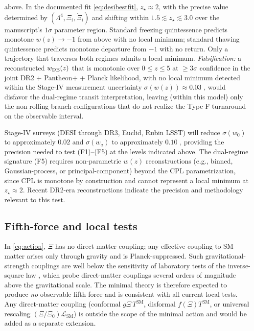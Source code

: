 \documentclass[11pt,reqno]{amsart}
\theoremstyle{plain}
\theoremstyle{definition}
\theoremstyle{remark}
\newcommand{\SM}{\mathrm{SM}}
\begin{document}
\begin{enumerate}
        above. In the documented fit \eqref{eq:desibestfit},
        $z_\star \approx 2$, with the precise value determined by
        $(\Lambda^{4}, \Xi_i, \dot\Xi_i)$ and shifting within
        $1.5 \lesssim z_\star \lesssim 3.0$ over the manuscript's
        $1\sigma$ parameter region. Standard freezing quintessence
        \cite{CaldwellLinder2005} predicts monotone $w(z) \to -1$ from
        above with no local minimum; standard thawing quintessence
        predicts monotone departure from $-1$ with no return. Only a
        trajectory that traverses both regimes admits a local minimum.
        \emph{Falsification:} a reconstructed $w_{\rm DE}(z)$ that is
        monotonic over $0 \leq z \leq 5$ at $\geq 3\sigma$ confidence
        in the joint DR2 + Pantheon+ + Planck likelihood, with no
        local minimum detected within the Stage-IV measurement
        uncertainty $\sigma(w(z)) \approx 0.03$
        \cite{ShajibFrieman2025}, would disfavor the dual-regime
        transit interpretation, leaving (within this model) only the
        non-rolling-branch configurations that do not realize the
        Type-F turnaround on the observable interval.
\end{enumerate}
Stage-IV surveys (DESI through DR3, Euclid, Rubin LSST) will reduce
$\sigma(w_0)$ to approximately $0.02$ and $\sigma(w_a)$ to approximately
$0.10$ \cite{ShajibFrieman2025,Turyshev2026Review}, providing the
precision needed to test (F1)--(F5) at the levels indicated above.
The dual-regime signature (F5) requires non-parametric $w(z)$
reconstructions (e.g., binned, Gaussian-process, or principal-component)
beyond the CPL parametrization, since CPL is monotone by construction
and cannot represent a local minimum at $z_\star \approx 2$. Recent
DR2-era reconstructions \cite{Wang2026QReconstruction,Adil2026Analytic}
indicate the precision and methodology relevant to this test.

\subsection{Fifth-force and local tests}

In \eqref{eq:action}, $\Xi$ has no direct matter coupling; any effective
coupling to SM matter arises only through gravity and is Planck-suppressed.
Such gravitational-strength couplings are well below the sensitivity of
laboratory tests of the inverse-square law \cite{EotWash,MICROSCOPE},
which probe direct-matter couplings several orders of magnitude above
the gravitational scale. The minimal theory is therefore expected to
produce \emph{no} observable fifth force and is consistent with all
current local tests. Any direct-matter coupling (conformal
$g\Xi\, T^{\SM}$, disformal $f(\Xi) T^{\SM}$, or universal rescaling
$(\Xi/\Xi_0) \mathcal{L}_{\SM}$) is outside the scope of the minimal
action and would be added as a separate extension.
\end{document}
